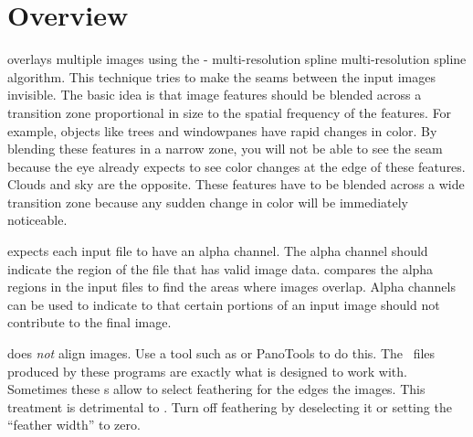

\chapter[Overview]{\label{sec:overview}%
  Overview}

%
%
%
%
%
\begin{sloppypar}
  \App{} overlays multiple images using the -
  multi-resolution spline multi-resolution spline algorithm.\footnotemark{} This technique tries
  to make the seams between the input images invisible.  The basic idea is that image features
  should be blended across a transition zone proportional in size to the spatial frequency of
  the features.  For example, objects like trees and windowpanes have rapid changes in color.
  By blending these features in a narrow zone, you will not be able to see the seam because the
  eye already expects to see color changes at the edge of these features.  Clouds and sky are
  the opposite.  These features have to be blended across a wide transition zone because any
  sudden change in color will be immediately noticeable.%
\end{sloppypar}

%
%
\App{} expects each input file to have an alpha channel.  The alpha channel should indicate the
region of the file that has valid image data.  \App{} compares the alpha regions in the input
files to find the areas where images overlap.  Alpha channels can be used to indicate to \App{}
that certain portions of an input image should not contribute to the final image.

%
%
%
\App{} does \emph{not} align images.  Use a tool such as  or PanoTools to do
this.  The ~files produced by these programs are exactly what \App{} is designed
to work with.  Sometimes these s allow to select feathering for the edges the
images.  This treatment is detrimental to \App{}.  Turn off feathering by deselecting it or
setting the ``feather width'' to zero.

